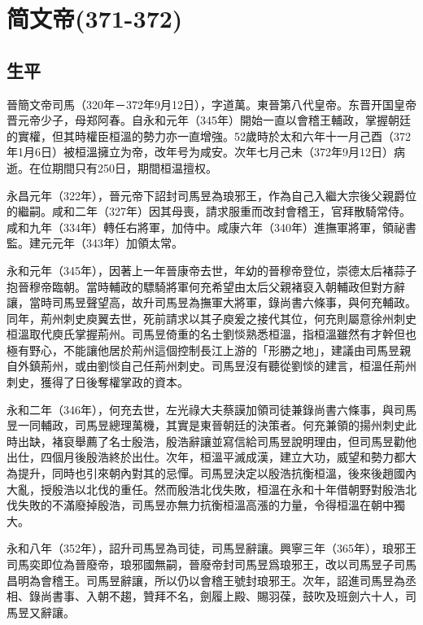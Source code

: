 
\section{简文帝\tiny(371-372)}

\subsection{生平}

晉簡文帝司馬（320年－372年9月12日），字道萬。東晉第八代皇帝。东晋开国皇帝晋元帝少子，母郑阿春。自永和元年（345年）開始一直以會稽王輔政，掌握朝廷的實權，但其時權臣桓溫的勢力亦一直增強。52歲時於太和六年十一月己酉（372年1月6日）被桓溫擁立为帝，改年号为咸安。次年七月己未（372年9月12日）病逝。在位期間只有250日，期間桓温擅权。

永昌元年（322年），晉元帝下詔封司馬昱為琅邪王，作為自己入繼大宗後父親爵位的繼嗣。咸和二年（327年）因其母喪，請求服重而改封會稽王，官拜散騎常侍。咸和九年（334年）轉任右將軍，加侍中。咸康六年（340年）進撫軍將軍，領祕書監。建元元年（343年）加領太常。

永和元年（345年），因著上一年晉康帝去世，年幼的晉穆帝登位，崇德太后褚蒜子抱晉穆帝臨朝。當時輔政的驃騎將軍何充希望由太后父親褚裒入朝輔政但對方辭讓，當時司馬昱聲望高，故升司馬昱為撫軍大將軍，錄尚書六條事，與何充輔政。同年，荊州刺史庾翼去世，死前請求以其子庾爰之接代其位，何充則屬意徐州刺史桓溫取代庾氏掌握荊州。司馬昱倚重的名士劉惔熟悉桓溫，指桓溫雖然有才幹但也極有野心，不能讓他居於荊州這個控制長江上游的「形勝之地」，建議由司馬昱親自外鎮荊州，或由劉惔自己任荊州刺史。司馬昱沒有聽從劉惔的建言，桓溫任荊州刺史，獲得了日後奪權掌政的資本。

永和二年（346年），何充去世，左光祿大夫蔡謨加領司徒兼錄尚書六條事，與司馬昱一同輔政，司馬昱總理萬機，其實是東晉朝廷的決策者。何充兼領的揚州刺史此時出缺，褚裒舉薦了名士殷浩，殷浩辭讓並寫信給司馬昱說明理由，但司馬昱勸他出仕，四個月後殷浩終於出仕。次年，桓溫平滅成漢，建立大功，威望和勢力都大為提升，同時也引來朝內對其的忌憚。司馬昱決定以殷浩抗衡桓溫，後來後趙國內大亂，授殷浩以北伐的重任。然而殷浩北伐失敗，桓溫在永和十年借朝野對殷浩北伐失敗的不滿廢掉殷浩，司馬昱亦無力抗衡桓溫高漲的力量，令得桓溫在朝中獨大。

永和八年（352年），詔升司馬昱為司徒，司馬昱辭讓。興寧三年（365年），琅邪王司馬奕即位為晉廢帝，琅邪國無嗣，晉廢帝封司馬昱爲琅邪王，改以司馬昱子司馬昌明為會稽王。司馬昱辭讓，所以仍以會稽王號封琅邪王。次年，詔進司馬昱為丞相、錄尚書事、入朝不趨，贊拜不名，劍履上殿、賜羽葆，鼓吹及班劍六十人，司馬昱又辭讓。

